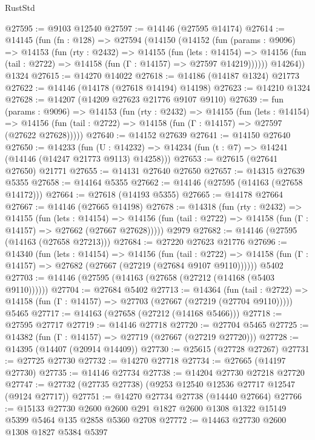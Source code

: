 \begin{lexlean}{RustStd}
\begin{coremodule}
@27595 := @9103 @12540
@27597 := @14146 (@27595 @14174)
@27614 := @14145
    (fun (fn : @128) =>
    @27594
      (@14150
        (@14152
          (fun (params : @9096) =>
          @14153
            (fun (rty : @2432) =>
            @14155
              (fun (lets : @14154) =>
              @14156 (fun (tail : @2722) => @14158 (fun (Γ : @14157) => @27597 @14219))))))
        @14264))
    @1324
@27615 := @14270 @14022
@27618 := @14186 (@14187 @1324) @21773
@27622 := @14146 (@14178 (@27618 @14194) @14198)
@27623 := @14210 @1324
@27628 := @14207 (@14209 @27623 @21776 @9107 @9110)
@27639 := fun (params : @9096) =>
  @14153
    (fun (rty : @2432) =>
    @14155
      (fun (lets : @14154) =>
      @14156 (fun (tail : @2722) => @14158 (fun (Γ : @14157) => @27597 (@27622 @27628)))))
@27640 := @14152 @27639
@27641 := @14150 @27640
@27650 := @14233
    (fun (U : @14232) => @14234 (fun (t : @7) => @14241 (@14146 (@14247 @21773 @9113) @14258)))
@27653 := @27615 (@27641 @27650) @21771
@27655 := @14131 @27640 @27650
@27657 := @14315 @27639 @5355
@27658 := @14164 @5355
@27662 := @14146 (@27595 (@14163 (@27658 @14172)))
@27664 := @27618 (@14193 @5355)
@27665 := @14178 @27664
@27667 := @14146 (@27665 @14198)
@27678 := @14318
    (fun (rty : @2432) =>
    @14155
      (fun (lets : @14154) =>
      @14156 (fun (tail : @2722) => @14158 (fun (Γ : @14157) => @27662 (@27667 @27628)))))
    @2979
@27682 := @14146 (@27595 (@14163 (@27658 @27213)))
@27684 := @27220 @27623 @21776
@27696 := @14340
    (fun (lets : @14154) =>
    @14156
      (fun (tail : @2722) =>
      @14158 (fun (Γ : @14157) => @27682 (@27667 (@27219 (@27684 @9107 @9110))))))
    @5402
@27703 := @14146 (@27595 (@14163 (@27658 (@27212 (@14168 (@5403 @9110))))))
@27704 := @27684 @5402
@27713 := @14364
    (fun (tail : @2722) => @14158 (fun (Γ : @14157) => @27703 (@27667 (@27219 (@27704 @9110)))))
    @5465
@27717 := @14163 (@27658 (@27212 (@14168 @5466)))
@27718 := @27595 @27717
@27719 := @14146 @27718
@27720 := @27704 @5465
@27725 := @14382 (fun (Γ : @14157) => @27719 (@27667 (@27219 @27720)))
@27728 := @14395 (@14407 (@20914 @14409))
@27730 := @25615 (@27728 @27267)
@27731 := @27725 @27730
@27732 := @14270 @27718
@27734 := @27665 (@14197 @27730)
@27735 := @14146 @27734
@27738 := @14204 @27730 @27218 @27720
@27747 := @27732 (@27735 @27738) (@9253 @12540 @12536 @27717 @12547 (@9124 @27717))
@27751 := @14270 @27734 @27738 (@14440 @27664)
@27766 := @15133
    @27730
    @2600
    @2600
    @291
    @1827
    @2600
    @1308
    @1322
    @15149
    @5399
    @5464
    @135
    @2858
    @5360
    @2708
@27772 := @14463 @27730 @2600 @1308 @1827 @5384 @5397

\end{coremodule}
\end{lexlean}
